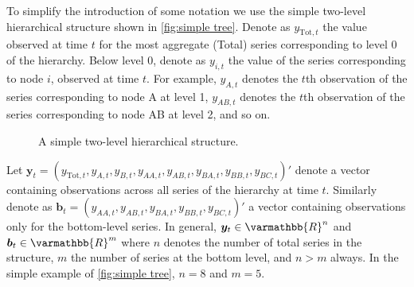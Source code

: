 \documentclass[graybox]{svmult}
\begin{document}
To simplify the introduction of some notation we use the simple two-level hierarchical structure shown in \autoref{fig:simple tree}. Denote as $y_{\text{Tot},t}$ the value observed at time $t$ for the most aggregate (Total) series corresponding to level 0 of the hierarchy. Below level 0, denote as $y_{i,t}$ the value of the series corresponding to node $i$, observed at time $t$. For example, $y_{A,t}$ denotes the $t$th observation of the series corresponding to node A at level 1, $y_{AB,t}$ denotes the $t$th observation of the series corresponding to node AB at level 2, and so on.

\begin{figure}[!hbt]\sidecaption[t]\centering
  \caption{A simple two-level hierarchical structure.}
	\label{fig:simple tree}
\end{figure}

Let $\bm{y}_t = (y_{\text{Tot},t},y_{A,t}, y_{B,t},y_{AA,t}, y_{AB,t}, y_{BA,t}, y_{BB,t},y_{BC,t})'$ denote a vector containing observations across all series of the hierarchy at time $t$. Similarly denote as $\bm{b}_t = (y_{AA,t}, y_{AB,t}, y_{BA,t}, y_{BB,t}, y_{BC,t})'$ a vector containing observations only for the bottom-level series. In general, $\bm{y}_t\in \varmathbb{R}^n$ and $\bm{b}_t \in \varmathbb{R}^m$ where $n$ denotes the number of total series in the structure, $m$ the number of series at the bottom level, and $n>m$ always. In the simple example of \autoref{fig:simple tree}, $n=8$ and $m=5$.
\end{document}

